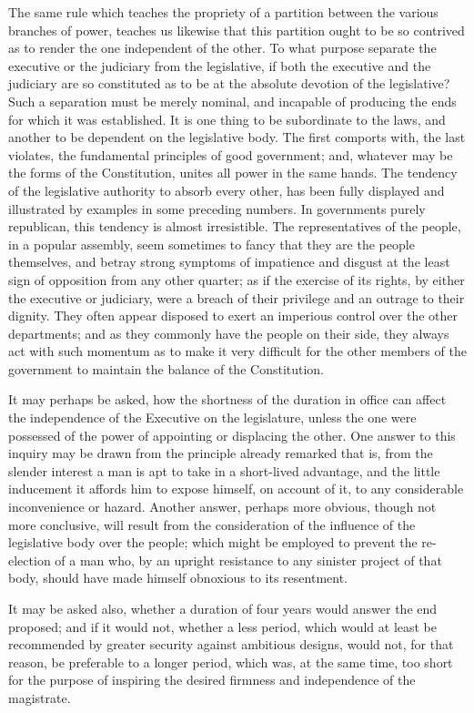 The same rule which teaches the propriety of a partition between the various branches of power, teaches us likewise that this partition ought to be so contrived as to render the one independent of the other. 
To what purpose separate the executive or the judiciary from the legislative, if both the executive and the judiciary are so constituted as to be at the absolute devotion of the legislative? 
Such a separation must be merely nominal, and incapable of producing the ends for which it was established. 
It is one thing to be subordinate to the laws, and another to be dependent on the legislative body. 
The first comports with, the last violates, the fundamental principles of good government; and, whatever may be the forms of the Constitution, unites all power in the same hands. 
The tendency of the legislative authority to absorb every other, has been fully displayed and illustrated by examples in some preceding numbers. 
In governments purely republican, this tendency is almost irresistible. 
The representatives of the people, in a popular assembly, seem sometimes to fancy that they are the people themselves, and betray strong symptoms of impatience and disgust at the least sign of opposition from any other quarter; as if the exercise of its rights, by either the executive or judiciary, were a breach of their privilege and an outrage to their dignity. 
They often appear disposed to exert an imperious control over the other departments; and as they commonly have the people on their side, they always act with such momentum as to make it very difficult for the other members of the government to maintain the balance of the Constitution.

It may perhaps be asked, how the shortness of the duration in office can affect the independence of the Executive on the legislature, unless the one were possessed of the power of appointing or displacing the other. 
One answer to this inquiry may be drawn from the principle already remarked that is, from the slender interest a man is apt to take in a short-lived advantage, and the little inducement it affords him to expose himself, on account of it, to any considerable inconvenience or hazard. 
Another answer, perhaps more obvious, though not more conclusive, will result from the consideration of the influence of the legislative body over the people; which might be employed to prevent the re-election of a man who, by an upright resistance to any sinister project of that body, should have made himself obnoxious to its resentment.

It may be asked also, whether a duration of four years would answer the end proposed; and if it would not, whether a less period, which would at least be recommended by greater security against ambitious designs, would not, for that reason, be preferable to a longer period, which was, at the same time, too short for the purpose of inspiring the desired firmness and independence of the magistrate.

